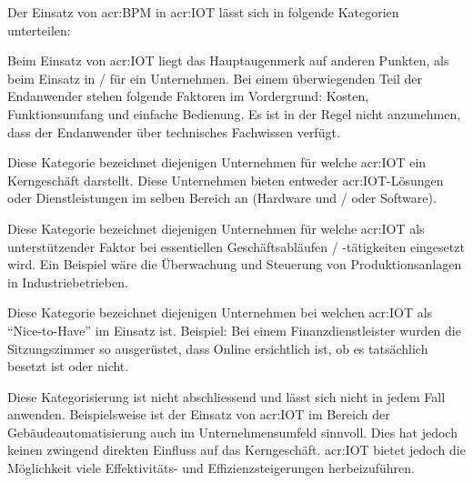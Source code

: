 Der Einsatz von \gls{acr:BPM} in \gls{acr:IOT} lässt sich in folgende Kategorien unterteilen:
\begin{itemize}
{Beim Einsatz von \gls{acr:IOT} liegt das Hauptaugenmerk auf anderen Punkten, als beim Einsatz in / für ein Unternehmen. Bei einem überwiegenden Teil der Endanwender stehen folgende Faktoren im Vordergrund: Kosten, Funktionsumfang und einfache Bedienung. Es ist in der Regel nicht anzunehmen, dass der Endanwender über technisches Fachwissen verfügt.}

{Diese Kategorie bezeichnet diejenigen Unternehmen für welche \gls{acr:IOT} ein Kerngeschäft darstellt. Diese Unternehmen bieten entweder \gls{acr:IOT}-Lösungen oder Dienstleistungen im selben Bereich an (Hardware und / oder Software).}
 
{Diese Kategorie bezeichnet diejenigen Unternehmen für welche \gls{acr:IOT} als unterstützender Faktor bei essentiellen Geschäftsabläufen / -tätigkeiten eingesetzt wird. Ein Beispiel wäre die Überwachung und Steuerung von Produktionsanlagen in Industriebetrieben.}

{Diese Kategorie bezeichnet diejenigen Unternehmen bei welchen \gls{acr:IOT} als "`Nice-to-Have"' im Einsatz ist. Beispiel: Bei einem Finanzdienstleister wurden die Sitzungszimmer so ausgerüstet, dass Online ersichtlich ist, ob es tatsächlich besetzt ist oder nicht.}
\end{itemize} 

Diese Kategorisierung ist nicht abschliessend und lässt sich nicht in jedem Fall anwenden. Beispielsweise ist der Einsatz von \gls{acr:IOT} im Bereich der Gebäudeautomatisierung auch im Unternehmensumfeld sinnvoll. Dies hat jedoch keinen zwingend direkten Einfluss auf das Kerngeschäft. \gls{acr:IOT} bietet jedoch die Möglichkeit viele Effektivitäts- und Effizienzsteigerungen herbeizuführen.




